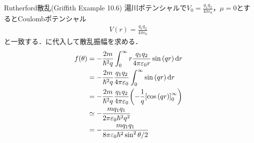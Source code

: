 \documentclass{report}
\begin{document}
  \begin{myex}{Rutherford散乱(Griffith Example 10.6)}{}
    湯川ポテンシャルで$V_0 = \frac{q_1q_2}{4\pi \epsilon_0}$，$\mu = 0$とするとCoulombポテンシャル
    \begin{align}
      V(r) = \frac{q_1q_2}{4\pi\epsilon_0}
    \end{align}
    と一致する．に代入して散乱振幅を求める．
    \begin{align}
      f(\theta) &= - \frac{2m}{\hbar^2q} \int_{0}^{\infty} r \frac{q_1q_2}{4\pi\varepsilon_0 r} \sin\qty(qr) \dd{r}\\
      &= -\frac{2m}{\hbar^2q}\frac{q_1q_2}{4\pi\varepsilon_0}\int_{0}^{\infty} \sin\qty(qr) \dd{r} \\
      &=  -\frac{2m}{\hbar^2q}\frac{q_1q_2}{4\pi\varepsilon_0}\qty(-\frac{1}{q}\qty[\cos\qty(qr)]_0^{\infty})\\
      &\simeq - \frac{mq_1q_1}{2\pi\varepsilon_0\hbar^2q^2}\\
      &= - \frac{mq_1q_1}{8\pi\varepsilon_0\hbar^2 \sin^2 \theta/2}
    \end{align}
  \end{myex}
\end{document}

